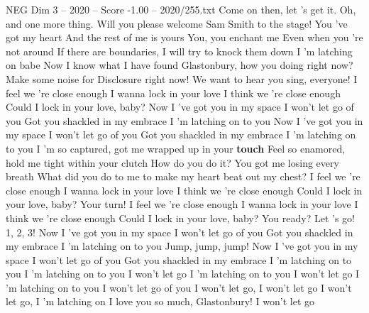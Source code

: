 \begin{textsample}{NEG Dim 3 – 2020 – Score -1.00 – 2020/255.txt}  \label{ex:f3_neg_038}
Come on then, let 's get it.
Oh, and one more thing.
Will you please welcome Sam Smith to the stage!
You 've got my heart And the rest of me is yours You, you enchant me Even when you 're not around If there are boundaries, I will try to knock them down I 'm latching on babe Now I know what I have found Glastonbury, how you doing right now?
Make some noise for Disclosure right now!
We want to hear you sing, everyone!
I feel we 're close enough I wanna lock in your love I think we 're close enough Could I lock in your love, baby?
Now I 've got you in my space I won't let go of you Got you shackled in my embrace I 'm latching on to you Now I 've got you in my space I won't let go of you Got you shackled in my embrace I 'm latching on to you I 'm so captured, got me wrapped up in your \textbf{touch} Feel so enamored, hold me tight within your clutch How do you do it?
You got me losing every breath What did you do to me to make my heart beat out my chest?
I feel we 're close enough I wanna lock in your love I think we 're close enough Could I lock in your love, baby?
Your turn!
I feel we 're close enough I wanna lock in your love I think we 're close enough Could I lock in your love, baby?
You ready?
Let 's go! 1, 2, 3!
Now I 've got you in my space I won't let go of you Got you shackled in my embrace I 'm latching on to you Jump, jump, jump!
Now I 've got you in my space I won't let go of you Got you shackled in my embrace I 'm latching on to you I 'm latching on to you I won't let go I 'm latching on to you I won't let go I 'm latching on to you I won't let go of you I won't let go, I won't let go I won't let go, I 'm latching on I love you so much, Glastonbury!
I won't let go

\end{textsample}
